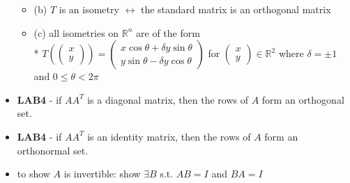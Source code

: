 \documentclass[10pt, portrait]{article}
\let\iff\leftrightarrow
\begin{document}
\begin{itemize}
\begin{itemize}
        \item (b) $T$ is an isometry $\iff$ the standard matrix is an orthogonal matrix
        \item (c) all isometries on $\mathbb{R}^n$ are of the form
            \\* $T(\begin{pmatrix}
                x\\y
            \end{pmatrix}) = \begin{pmatrix}
                x\cos\theta + \delta y\sin\theta \\
                y\sin\theta - \delta y\cos\theta
            \end{pmatrix}$ for $\begin{pmatrix}
                x\\y
            \end{pmatrix} \in \mathbb{R}^2$
            where $\delta = \pm 1$ and $0 \leq \theta < 2\pi$
    \end{itemize}
    \item \textbf{LAB4} - if $AA^T$ is a diagonal matrix, then the rows of $A$ form an orthogonal set.
    \item \textbf{LAB4} - if $AA^T$ is an identity matrix, then the rows of $A$ form an orthonormal set.
\end{itemize}

\begin{itemize}
    \item to show $A$ is invertible: show $\exists B$ s.t. $AB = I$ and $BA=I$
\end{itemize}
\end{document}
